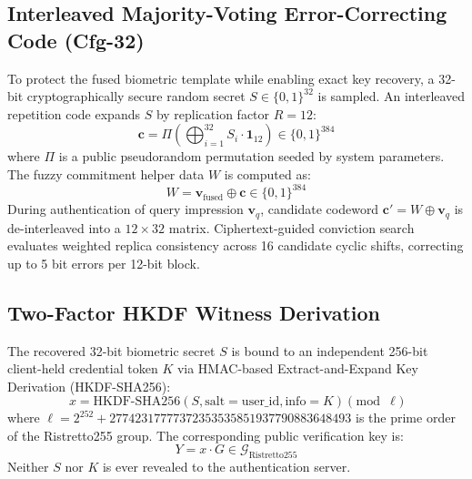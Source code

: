 \documentclass[conference]{IEEEtran}
\begin{document}
\subsection{Interleaved Majority-Voting Error-Correcting Code (Cfg-32)}
To protect the fused biometric template while enabling exact key recovery, a 32-bit cryptographically secure random secret $S \in \{0, 1\}^{32}$ is sampled. An interleaved repetition code expands $S$ by replication factor $R = 12$:
\begin{equation}
\mathbf{c} = \Pi \left( \bigoplus_{i=1}^{32} S_i \cdot \mathbf{1}_{12} \right) \in \{0, 1\}^{384}
\end{equation}
where $\Pi$ is a public pseudorandom permutation seeded by system parameters. The fuzzy commitment helper data $W$ is computed as:
\begin{equation}
W = \mathbf{v}_{\text{fused}} \oplus \mathbf{c} \in \{0, 1\}^{384}
\end{equation}
During authentication of query impression $\mathbf{v}_q$, candidate codeword $\mathbf{c}' = W \oplus \mathbf{v}_q$ is de-interleaved into a $12 \times 32$ matrix. Ciphertext-guided conviction search evaluates weighted replica consistency across 16 candidate cyclic shifts, correcting up to 5 bit errors per 12-bit block.

\subsection{Two-Factor HKDF Witness Derivation}
The recovered 32-bit biometric secret $S$ is bound to an independent 256-bit client-held credential token $K$ via HMAC-based Extract-and-Expand Key Derivation (HKDF-SHA256):
\begin{equation}
x = \text{HKDF-SHA256}(S, \text{salt}=\text{user\_id}, \text{info}=K) \pmod \ell
\end{equation}
where $\ell = 2^{252} + 27742317777372353535851937790883648493$ is the prime order of the Ristretto255 group. The corresponding public verification key is:
\begin{equation}
Y = x \cdot G \in \mathcal{G}_{\text{Ristretto255}}
\end{equation}
Neither $S$ nor $K$ is ever revealed to the authentication server.
\end{document}
